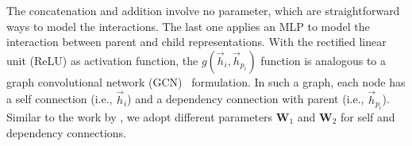 The concatenation and addition involve no parameter, which are straightforward ways to model the interactions. 
The last one applies an MLP to model the interaction between parent and child representations. 
With the rectified linear unit (ReLU) as activation function, the $g(\vec{h}_i, \vec{h}_{p_i})$ function is analogous to a graph convolutional network (GCN)~\cite{kipf2017semi} formulation. 
In such a graph, each node has a self connection (i.e., $\vec{h}_i$) and a dependency connection with parent (i.e., $\vec{h}_{p_i}$).  
Similar to the work by \citet{marcheggiani2017encoding}, we adopt different parameters $\mathbf{W}_1$ and $\mathbf{W}_2$ for self and dependency connections. 

